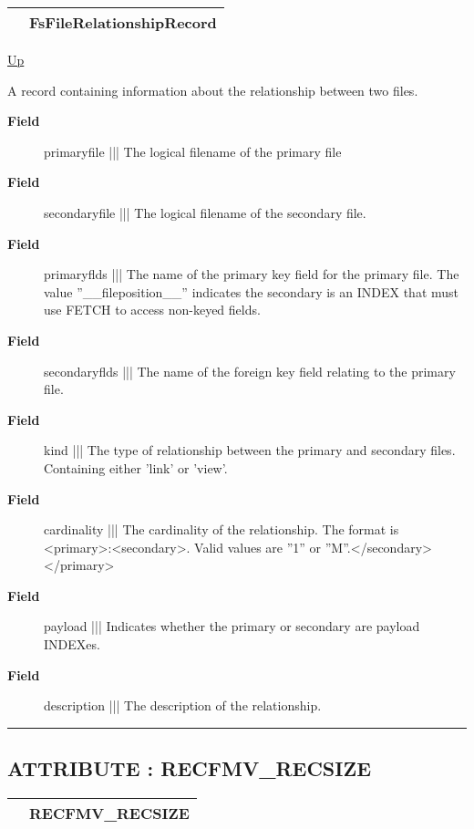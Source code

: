 {\renewcommand{\arraystretch}{1.5}
\begin{tabularx}{\textwidth}{|>{\raggedright\arraybackslash}l|X|}
\hline
\hspace{0pt} & FsFileRelationshipRecord \\
\hline
\end{tabularx}
}

\hyperlink{ecldoc:File}{Up}

\par
A record containing information about the relationship between two files.

\par
\begin{description}
\item [\textbf{Field}] primaryfile ||| The logical filename of the primary file
\item [\textbf{Field}] secondaryfile ||| The logical filename of the secondary file.
\item [\textbf{Field}] primaryflds ||| The name of the primary key field for the primary file. The value ''\_\_fileposition\_\_'' indicates the secondary is an INDEX that must use FETCH to access non-keyed fields.
\item [\textbf{Field}] secondaryflds ||| The name of the foreign key field relating to the primary file.
\item [\textbf{Field}] kind ||| The type of relationship between the primary and secondary files. Containing either 'link' or 'view'.
\item [\textbf{Field}] cardinality ||| The cardinality of the relationship. The format is <primary>:<secondary>. Valid values are ''1'' or ''M''.</secondary></primary>
\item [\textbf{Field}] payload ||| Indicates whether the primary or secondary are payload INDEXes.
\item [\textbf{Field}] description ||| The description of the relationship.
\end{description}

\rule{\textwidth}{0.4pt}
\subsection*{ATTRIBUTE : RECFMV\_RECSIZE}
\hypertarget{ecldoc:file.recfmv_recsize}{}

{\renewcommand{\arraystretch}{1.5}
\begin{tabularx}{\textwidth}{|>{\raggedright\arraybackslash}l|X|}
\hline
\hspace{0pt} & RECFMV\_RECSIZE \\
\hline
\end{tabularx}
}

